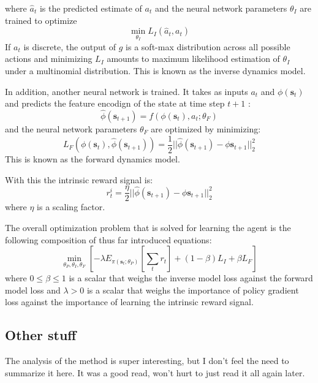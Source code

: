 \documentclass{article}
\begin{document}
where $ \hat{a}_{ t }  $ is the predicted estimate of $ a_{ t }  $
and the neural network parameters $ \theta_{ I }  $ are trained to optimize
\begin{equation}
		\min_{\theta_{ I }} L_{ I } (\hat{a}_{ t }, a_{ t })
\end{equation}
If $ a_{ t }  $ is discrete, the output of $ g  $ is a soft-max distribution
across all possible actions and minimizing $ L_{ I }  $ amounts to 
maximum likelihood estimation of $ \theta_{ I }  $ under a multinomial distribution.
This is known as the inverse dynamics model.

In addition, another neural network is trained. It
takes as inputs $ a_{ t }  $ and $ \phi (\bm{s}_{t})  $
and predicts the feature encodign of the state at time step $ t+1  $ :
\begin{equation}
		\hat{\phi} (\bm{s}_{t+1}) = f \left( \phi (\bm{s}_{t}), a_{ t }; \theta_{ F } \right) 
\end{equation}
and the neural network parameters $ \theta_{ F }  $
are optimized by minimizing:
\begin{equation}
		L_{ F } \left( \phi (\bm{s}_{t}), \hat{\phi} (\bm{s}_{t+1}) \right) =
		\frac{1}{2} || \hat{\phi} (\bm{s}_{t+1}) - \phi \bm{s}_{t+1}||_{ 2 }^{ 2 }
\end{equation}
This is known as the forward dynamics model.

With this the intrinsic reward signal is:
\begin{equation}
		r_{ t }^{ i } = \frac{\eta}{2} ||\hat{\phi} (\bm{s}_{t+1}) - \phi \bm{s}_{t+1} ||_{ 2 }^{ 2 }
\end{equation}
where $ \eta  $ is a scaling factor.

The overall optimization problem that is solved for learning
the agent is the following composition of thus far introduced equations:
\begin{equation}
		\min_{\theta_{ P }, \theta_{ I }, \theta_{ F }} \left[ 
				-\lambda E_{ \pi (\bm{s}_{t}; \theta_{ P })} \left[ \sum_{t}^{} r_{ t } \right] 
		+ (1 - \beta) L_{ I } + \beta L_{ F }
		\right] 
\end{equation}
where $ 0 \leq \beta \leq 1  $ is a scalar that weighs the inverse model
loss against the forward model loss and $ \lambda > 0  $
is a scalar that weighs the importance of policy gradient loss against the importance of learning
the intrinsic reward signal.


\subsection{Other stuff}
The analysis of the method is super interesting,
but I don't feel the need to summarize it here.
It was a good read, won't hurt to just read it all again later.
\end{document}
